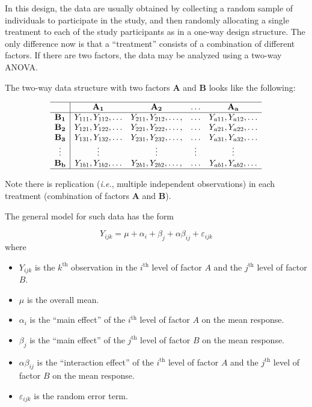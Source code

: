 \documentclass[
]{book}
\providecommand{\tightlist}{%
  \setlength{\itemsep}{0pt}\setlength{\parskip}{0pt}}
\begin{document}
In this design, the data are usually obtained by collecting a random sample of individuals to participate in the study, and then randomly allocating a single treatment to each of the study participants as in a one-way design structure.
The only difference now is that a ``treatment'' consists of a combination of different factors.
If there are two factors, the data may be analyzed using a two-way ANOVA.

The two-way data structure with two factors \(\mathbf{A}\) and \(\mathbf{B}\) looks like the following:

\[\begin{array}{c|cccc}
\hline
 & \mathbf{A_1} & \mathbf{A_2} & \mathbf{\ldots} & \mathbf{A_a} \\
\hline
\mathbf{B_1} & Y_{111}, Y_{112}, \ldots & Y_{211}, Y_{212}, \ldots, & \ldots & Y_{a11}, Y_{a12}, \ldots \\
\mathbf{B_2} & Y_{121}, Y_{122}, \ldots & Y_{221}, Y_{222}, \ldots, & \ldots & Y_{a21}, Y_{a22}, \ldots \\
\mathbf{B_3} & Y_{131}, Y_{132}, \ldots & Y_{231}, Y_{232}, \ldots, & \ldots & Y_{a31}, Y_{a32}, \ldots \\
\vdots & \vdots & \vdots & \vdots & \vdots \\
\mathbf{B_b} & Y_{1b1}, Y_{1b2}, \ldots & Y_{2b1}, Y_{2b2}, \ldots, & \ldots & Y_{ab1}, Y_{ab2}, \ldots \\
\hline
\end{array}\]

Note there is replication (\emph{i.e.}, multiple independent observations) in each treatment (combination of factors \(\mathbf{A}\) and \(\mathbf{B}\)).

The general model for such data has the form

\[Y_{ijk} = \mu + \alpha_i + \beta_j + \alpha\beta_{ij} + \varepsilon_{ijk}\]
where

\begin{itemize}
\tightlist
\item
  \(Y_{ijk}\) is the \(k^\mathrm{th}\) observation in the \(i^\mathrm{th}\) level of factor \(A\) and the \(j^\mathrm{th}\) level of factor \(B\).
\item
  \(\mu\) is the overall mean.
\item
  \(\alpha_i\) is the ``main effect'' of the \(i^\mathrm{th}\) level of factor \(A\) on the mean response.
\item
  \(\beta_j\) is the ``main effect'' of the \(j^\mathrm{th}\) level of factor \(B\) on the mean response.
\item
  \(\alpha\beta_{ij}\) is the ``interaction effect'' of the \(i^\mathrm{th}\) level of factor \(A\) and the \(j^\mathrm{th}\) level of factor \(B\) on the mean response.
\item
  \(\varepsilon_{ijk}\) is the random error term.
\end{itemize}
\end{document}
